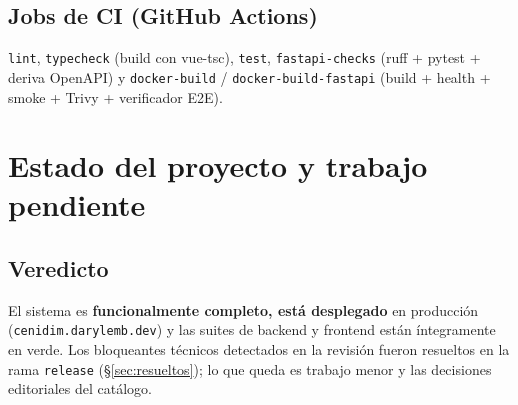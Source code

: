 \documentclass[11pt,letterpaper,twoside]{report}
\newcommand{\codigo}[1]{\texttt{#1}}
\begin{document}
\section{Jobs de CI (GitHub Actions)}
\codigo{lint}, \codigo{typecheck} (build con vue-tsc), \codigo{test},
\codigo{fastapi-checks} (ruff + pytest + deriva OpenAPI) y
\codigo{docker-build} / \codigo{docker-build-fastapi} (build + health +
smoke + Trivy + verificador E2E).

\chapter{Estado del proyecto y trabajo pendiente}
\label{cap:pendientes}

\section{Veredicto}
El sistema es \textbf{funcionalmente completo, está desplegado} en
producción (\codigo{cenidim.\allowbreak darylemb.dev}) y las suites de
backend y frontend están íntegramente en verde. Los bloqueantes técnicos
detectados en la revisión fueron resueltos en la rama \codigo{release}
(\S\ref{sec:resueltos}); lo que queda es trabajo menor y las decisiones
editoriales del catálogo.
\end{document}
